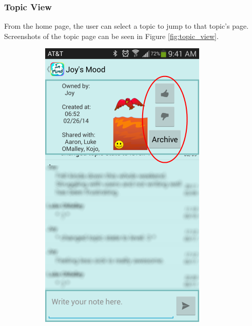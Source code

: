       \subsubsection{Topic View}
      From the home page,
      the user can select a topic to jump to that topic's page.
      Screenshots of the topic page can be seen in Figure \ref{fig:topic_view}.

    \begin{figure}
      \caption[Topic View]{\textbf{Topic View} --
          Topic views show the topic's current status icon,
          controls available to the user,
          and messages that have been left under that topic.
          Messages have been blurred, and controls are circled in red.
          (a) If you own a topic, you can adjust its status.
          (b) On someone else's topic, you can leave a smile.
          (c) You can see only your own archived topics,
          and you can bring them back from the archive
          and read the messages attached to it.}
      \centering
      \begin{subfigure}[b]{0.3\textwidth}
        \includegraphics[width=\textwidth]{topic_view_mine.png}

\end{subfigure}
\end{figure}
